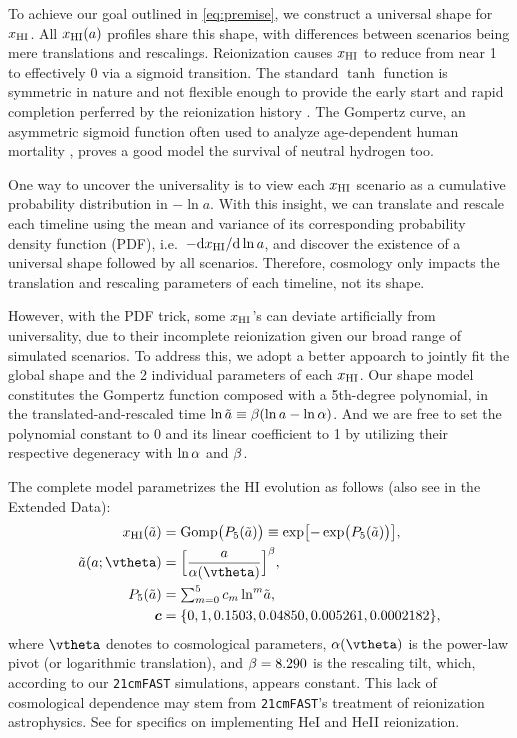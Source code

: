 To achieve our goal outlined in \cref{eq:premise}, we construct a
universal shape for $x_{\mathrm{HI}}$.
All $x_{\mathrm{HI}}(a)$ profiles share this shape, with differences between
scenarios being mere translations and rescalings.
Reionization causes $x_{\mathrm{HI}}$ to reduce from near 1 to effectively 0 via a
sigmoid transition.
The standard $\tanh$ function is symmetric in nature and not flexible
enough to provide the early start and rapid completion perferred by the
reionization history \cite{Trac2018, Doussot2019}.
The Gompertz curve, an asymmetric sigmoid function often used to analyze
age-dependent human mortality \cite{Gompertz1825}, proves a good model
the survival of neutral hydrogen too.

One way to uncover the universality is to view each $x_{\mathrm{HI}}$ scenario as
a cumulative probability distribution in $- \ln a$.
With this insight, we can translate and rescale each timeline using the
mean and variance of its corresponding probability density function
(PDF), i.e.\ $- \mathrm{d}x_{\mathrm{HI}} / \mathrm{d}\ln a$, and discover the
existence of a universal shape followed by all scenarios.
Therefore, cosmology only impacts the translation and rescaling
parameters of each timeline, not its shape.

However, with the PDF trick, some $x_{\mathrm{HI}}$'s can deviate artificially
from universality, due to their incomplete reionization given our broad
range of simulated scenarios.
To address this, we adopt a better appoarch to jointly fit the global
shape and the 2 individual parameters of each $x_{\mathrm{HI}}$.
Our shape model constitutes the Gompertz function composed with a
5th-degree polynomial, in the translated-and-rescaled time $\ln\tilde{a}
\equiv \beta (\ln a - \ln\alpha)$.
And we are free to set the polynomial constant to 0 and its linear
coefficient to 1 by utilizing their respective degeneracy with $\ln\alpha$
and $\beta$.

The complete model parametrizes the HI evolution as follows (also see
 in the Extended Data):
%
\begin{align}
\label{eq:uni}
x_\HI(\ar) &= \Gomp\bigl( P_5(\ar) \bigr)
  \equiv \exp\bigl[ - \exp\bigl( P_5(\ar) \bigr) \bigr], \\
%
\label{eq:map}
\ar(a; \vtheta) &= \Bigl[ \frac{a}{\ap(\vtheta)} \Bigr]^\tilt ,\\
%
\label{eq:poly}
P_5(\ar) &= {\textstyle\sum}_{m=0}^5 \, c_m \ln^m\!\ar, \\
%
\nonumber
\bm{c} &= \{0, 1, 0.1503, 0.04850, 0.005261, 0.0002182\},
\end{align}
%
where $\vtheta$ denotes to cosmological parameters, $\ap(\vtheta)$
is the power-law pivot (or logarithmic translation), and $\beta = 8.290$
is the rescaling tilt, which, according to our \texttt{21cmFAST}
simulations, appears constant.
This lack of cosmological dependence may stem from \texttt{21cmFAST}'s
treatment of reionization astrophysics.
See  for specifics on implementing HeI and HeII
reionization.

